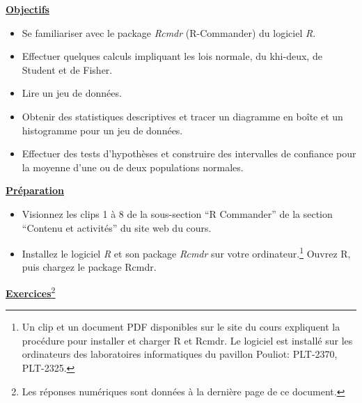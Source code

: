 \documentclass[12pt]{article}
\begin{document}
\vspace*{1mm}
\centerline{}
\vspace*{3.5mm}

\underline{\bf Objectifs}
\begin{itemize}
\item Se familiariser avec le package {\it Rcmdr} (R-Commander) du logiciel {\it R}.
\item Effectuer quelques calculs impliquant les lois normale, du khi-deux, de Student et de Fisher.
\item Lire un jeu de données.
\item Obtenir des statistiques descriptives et tracer un diagramme en boîte et un histogramme pour un jeu de données.
\item Effectuer des tests d'hypothèses et construire des intervalles de confiance pour la moyenne d'une ou de deux populations normales.
\end{itemize}

\vspace{3.5mm}

\underline{\bf Préparation}
\medskip
\begin{itemize}
\item Visionnez les clips 1 à 8 de la sous-section ``R Commander'' de la section ``Contenu et activités'' du site web du cours.
\item Installez le logiciel {\it R} et son package {\it Rcmdr}  sur votre ordinateur.\footnote{Un clip et un document PDF disponibles sur le site du cours expliquent la procédure pour installer et charger R et Rcmdr. Le logiciel est installé sur les ordinateurs des laboratoires informatiques du pavillon Pouliot: PLT-2370, PLT-2325.}  Ouvrez R, puis chargez le package Rcmdr.
\end{itemize}

\vspace{3.5mm}

\underline{\bf Exercices}\footnote{Les réponses numériques sont données à la dernière page de ce document.}
\end{document}
